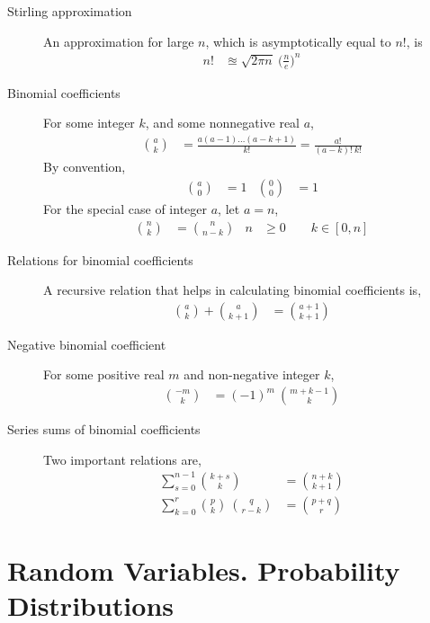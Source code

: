 \begin{description}
    \item[Stirling approximation] An approximation for large $ n $, which is
          asymptotically equal to $ n! $, is
          \begin{align}
              n! & \approxeq \sqrt{2\pi n}\ \Bigg( \frac{n}{e} \Bigg)^n
          \end{align}

    \item[Binomial coefficients] For some integer $ k $, and some nonnegative real $ a $,
          \begin{align}
              \binom{a}{k} & = \frac{a(a-1)\dots(a-k+1)}{k!} = \frac{a!}{(a-k)!\ k!}
          \end{align}
          By convention,
          \begin{align}
              \binom{a}{0} & = 1 & \binom{0}{0} & = 1
          \end{align}
          For the special case of integer $ a $, let $ a = n $,
          \begin{align}
              \binom{n}{k} & = \binom{n}{n-k} & n & \geq 0 \qquad k \in [0,n]
          \end{align}

    \item[Relations for binomial coefficients] A recursive relation that helps in
          calculating binomial coefficients is,
          \begin{align}
              \binom{a}{k} + \binom{a}{k+1} & = \binom{a+1}{k+1}
          \end{align}

    \item[Negative binomial coefficient] For some positive real $ m $ and non-negative
          integer $ k $,
          \begin{align}
              \binom{-m}{k} & = (-1)^m\ \binom{m+k-1}{k}
          \end{align}

    \item[Series sums of binomial coefficients] Two important relations are,
          \begin{align}
              \sum_{s=0}^{n-1}\binom{k+s}{k}             & = \binom{n+k}{k+1} \\
              \sum_{k=0}^{r}\binom{p}{k}\ \binom{q}{r-k} & = \binom{p+q}{r}
          \end{align}
\end{description}

\section{Random Variables. Probability Distributions}

